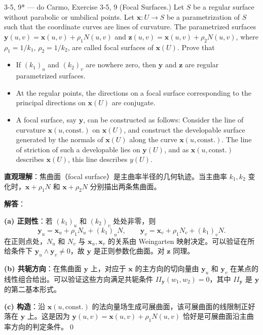 \begin{exercise}{3-5, 9* — do Carmo, Exercise 3-5, 9}
(Focal Surfaces.) Let $S$ be a regular surface without parabolic or umbilical points. Let $\mathbf{x} \colon U \to S$ be a parametrization of $S$ such that the coordinate curves are lines of curvature. The parametrized surfaces $\mathbf{y} (u, v) = \mathbf{x} (u, v) + \rho_ {1} N (u, v)$ and $\mathbf{z} (u, v) = \mathbf{x} (u, v) + \rho_ {2} N (u, v)$, where $\rho_{1} = 1 / k_{1}$, $\rho_{2} = 1 / k_{2}$, are called focal surfaces of $\mathbf{x}(U)$. Prove that
\begin{itemize}
\item[a.] If $(k_{1})_{u}$ and $(k_{2})_{v}$ are nowhere zero, then $\mathbf{y}$ and $\mathbf{z}$ are regular parametrized surfaces.
\item[b.] At the regular points, the directions on a focal surface corresponding to the principal directions on $\mathbf{x}(U)$ are conjugate.
\item[c.] A focal surface, say $\mathbf{y}$, can be constructed as follows: Consider the line of curvature $\mathbf{x}(u,\mathrm{const.})$ on $\mathbf{x}(U)$, and construct the developable surface generated by the normals of $\mathbf{x}(U)$ along the curve $\mathbf{x}(u,\mathrm{const.})$. The line of striction of such a developable lies on $\mathbf{y}(U)$, and as $\mathbf{x}(u,\mathrm{const.})$ describes $\mathbf{x}(U)$, this line describes $y(U)$.
\end{itemize}
\end{exercise}
\begin{solution}
\textbf{直观理解}：焦曲面（focal surface）是主曲率半径的几何轨迹。当主曲率 $k_1, k_2$ 变化时，$\mathbf{x} + \rho_1 N$ 和 $\mathbf{x} + \rho_2 N$ 分别描出两条焦曲面。

\textbf{解答}：

\textbf{(a) 正则性}：若 $(k_1)_u$ 和 $(k_2)_v$ 处处非零，则
\[
\mathbf{y}_u = \mathbf{x}_u + \rho_1 N_u + (k_1)_u N,\qquad \mathbf{y}_v = \mathbf{x}_v + \rho_1 N_v + (k_1)_v N.
\]
在正则点处，$N_u$ 和 $N_v$ 与 $\mathbf{x}_u, \mathbf{x}_v$ 的关系由 Weingarten 映射决定。可以验证在所给条件下 $\mathbf{y}_u\wedge\mathbf{y}_v \neq 0$，故 $\mathbf{y}$ 是正则参数化曲面。对 $\mathbf{z}$ 同理。

\textbf{(b) 共轭方向}：在焦曲面 $\mathbf{y}$ 上，对应于 $\mathbf{x}$ 的主方向的切向量由 $\mathbf{y}_u$ 和 $\mathbf{y}_v$ 在某点的线性组合给出。可以验证这些方向满足共轭条件 $II_{\mathbf{y}}(w_1, w_2) = 0$，其中 $II_{\mathbf{y}}$ 是 $\mathbf{y}$ 的第二基本形式。

\textbf{(c) 构造}：沿 $\mathbf{x}(u,\mathrm{const.})$ 的法向量场生成可展曲面，该可展曲面的线限制正好落在 $\mathbf{y}$ 上。这是因为 $\mathbf{y}(u,v) = \mathbf{x}(u,v) + \rho_1 N(u,v)$ 恰好是可展曲面沿主曲率方向的判定条件。\qed
\end{solution}

